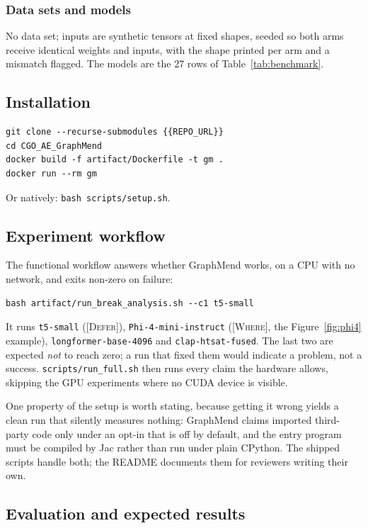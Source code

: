 \subsubsection{Data sets and models}
No data set; inputs are synthetic tensors at fixed shapes, seeded so both arms
receive identical weights and inputs, with the shape printed per arm and a
mismatch flagged. The models are the 27 rows of Table~\ref{tab:benchmark}.

\subsection{Installation}

\begin{verbatim}
git clone --recurse-submodules {{REPO_URL}}
cd CGO_AE_GraphMend
docker build -f artifact/Dockerfile -t gm .
docker run --rm gm
\end{verbatim}

\noindent Or natively: \texttt{bash scripts/setup.sh}.

\subsection{Experiment workflow}

The functional workflow answers whether GraphMend works, on a CPU with no
network, and exits non-zero on failure:

\begin{verbatim}
bash artifact/run_break_analysis.sh --c1 t5-small
\end{verbatim}

\noindent It runs \texttt{t5-small}
(\textsc{[Defer]}), \texttt{Phi-4-mini-instruct} (\textsc{[Where]}, the
Figure~\ref{fig:phi4} example), \texttt{longformer-base-4096} and
\texttt{clap-htsat-fused}. The last two are expected \emph{not} to reach zero;
a run that fixed them would indicate a problem, not a success.
\texttt{scripts/run\_full.sh} then runs every claim the hardware allows,
skipping the GPU experiments where no CUDA device is visible.

One property of the setup is worth stating, because getting it wrong yields a
clean run that silently measures nothing: GraphMend claims imported third-party
code only under an opt-in that is off by default, and the entry program must be
compiled by Jac rather than run under plain CPython. The shipped scripts handle
both; the README documents them for reviewers writing their own.

\subsection{Evaluation and expected results}

